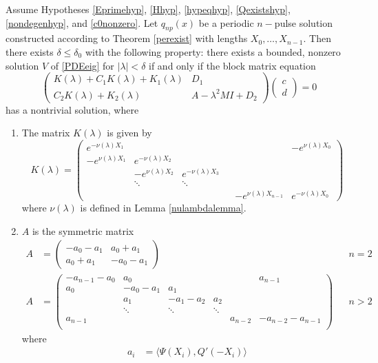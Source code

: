 \documentclass[thesis.tex]{subfiles}
\begin{document}
\begin{theorem}\label{blockmatrixtheorem}
Assume Hypotheses \ref{Eprimehyp}, \ref{Hhyp}, \ref{hypeqhyp}, \ref{Qexistshyp}, \ref{nondegenhyp}, and \ref{c0nonzero}. Let $q_{np}(x)$ be a periodic $n-$pulse solution constructed according to Theorem \ref{perexist} with lengths $X_0, \dots, X_{n-1}$. Then there exists $\delta \leq \delta_0$ with the following property: there exists a bounded, nonzero solution $V$ of \eqref{PDEeig} for $|\lambda| < \delta$ if and only if the block matrix equation
\begin{equation}\label{blockeq}
\begin{pmatrix}
K(\lambda) + C_1 K(\lambda) + K_1(\lambda) & D_1 \\
C_2 K(\lambda) + K_2(\lambda) & A - \lambda^2 MI + D_2
\end{pmatrix}
\begin{pmatrix} c \\ d \end{pmatrix} = 0
\end{equation}
has a nontrivial solution, where 

\begin{enumerate}
\item The matrix $K(\lambda)$ is given by
\begin{equation}
K(\lambda) = 
\begin{pmatrix}
e^{-\nu(\lambda)X_1} & & & & & -e^{\nu(\lambda)X_0} \\
-e^{\nu(\lambda)X_1} & e^{-\nu(\lambda)X_2} \\
& -e^{\nu(\lambda)X_2} & e^{-\nu(\lambda)X_3} \\
& \ddots & \ddots & &&  \\
& & & & -e^{\nu(\lambda)X_{n-1}} & e^{-\nu(\lambda)X_0} 
\end{pmatrix}
\end{equation}
where $\nu(\lambda)$ is defined in Lemma \ref{nulambdalemma}.

\item $A$ is the symmetric matrix
\begin{align}\label{Asymm}
A &= \begin{pmatrix}
-a_0 -a_1 & a_0 + a_1 \\
a_0 + a_1 & -a_0 - a_1
\end{pmatrix} && n = 2 \\
A &= \begin{pmatrix}
-a_{n-1} - a_0 & a_0 & & &  & a_{n-1}\\
a_0 & -a_0 - a_1 &  a_1 \\
& a_1 & -a_1 - a_2 &  a_2 \\
& \ddots & \ddots & \ddots \\
a_{n-1} & & & & a_{n-2} & -a_{n-2} - a_{n-1} \\
\end{pmatrix} && n > 2 \nonumber
\end{align}
where
\begin{align*}
a_i &= \langle \Psi(X_i), Q'(-X_i) \rangle \\
\end{align*}


\end{enumerate}
\end{theorem}
\end{document}
